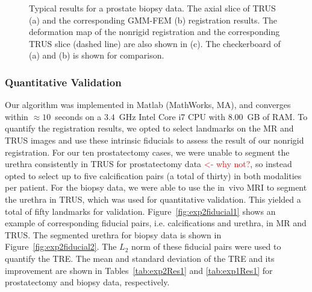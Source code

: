\documentclass[journal]{IEEEtran}
\newcommand{\comment}[1]{\textcolor{red}{#1}}
\begin{document}
\begin{figure}
    \caption{Typical results for a prostate biopsy data. The axial slice of TRUS (a) and the corresponding GMM-FEM (b) registration results. The deformation map of the nonrigid registration and the corresponding TRUS slice (dashed line) are also shown in (c). The checkerboard of (a) and (b) is shown for comparison. \label{fig:exp1fig2}}
\end{figure}
\subsubsection{Quantitative Validation}
Our algorithm was implemented in Matlab (MathWorks, MA), and converges within $\approx10$~seconds on a $3.4$~GHz Intel Core i7 CPU with $8.00$~GB of RAM. To quantify the registration results, we opted to select landmarks on the MR and TRUS images and use these intrinsic fiducials to assess the result of our nonrigid registration. For our ten prostatectomy cases, we were unable to segment the urethra consistently in TRUS for prostatectomy data \comment{<- why not?}, so instead opted to select up to five calcification pairs (a total of thirty) in both modalities per patient. For the biopsy data, we were able to use the in~vivo MRI to segment the urethra in TRUS, which was used for quantitative validation. This yielded a total of fifty landmarks for validation. Figure~\ref{fig:exp2fiducial1} shows an example of corresponding fiducial pairs, i.e. calcifications and urethra, in MR and TRUS. The segmented urethra for biopsy data is shown in Figure~\ref{fig:exp2fiducial2}. The $L_2$ norm of these fiducial pairs were used to quantify the TRE. The mean and standard deviation of the TRE and its improvement are shown in Tables~\ref{tab:exp2Res1} and \ref{tab:exp1Res1} for prostatectomy and biopsy data, respectively.
\end{document}
